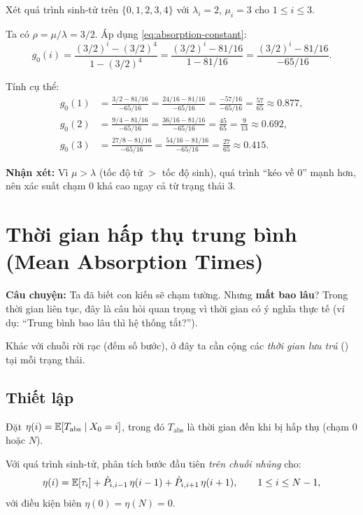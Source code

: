 \begin{example}[Xác suất hấp thụ với $N = 4$]
\label{ex:absorption-N4}
Xét quá trình sinh-tử trên $\{0, 1, 2, 3, 4\}$ với $\lambda_i = 2$, $\mu_i = 3$ cho $1 \leq i \leq 3$.

Ta có $\rho = \mu/\lambda = 3/2$. Áp dụng \eqref{eq:absorption-constant}:
\[
  g_0(i) = \frac{(3/2)^i - (3/2)^4}{1 - (3/2)^4}
  = \frac{(3/2)^i - 81/16}{1 - 81/16}
  = \frac{(3/2)^i - 81/16}{-65/16}.
\]

Tính cụ thể:
\begin{align*}
  g_0(1) &= \frac{3/2 - 81/16}{-65/16} = \frac{24/16 - 81/16}{-65/16} = \frac{-57/16}{-65/16} = \frac{57}{65} \approx 0.877, \\
  g_0(2) &= \frac{9/4 - 81/16}{-65/16} = \frac{36/16 - 81/16}{-65/16} = \frac{45}{65} = \frac{9}{13} \approx 0.692, \\
  g_0(3) &= \frac{27/8 - 81/16}{-65/16} = \frac{54/16 - 81/16}{-65/16} = \frac{27}{65} \approx 0.415.
\end{align*}

\textbf{Nhận xét:} Vì $\mu > \lambda$ (tốc độ tử $>$ tốc độ sinh), quá trình ``kéo về 0'' mạnh hơn,
nên xác suất chạm 0 khá cao ngay cả từ trạng thái 3.
\end{example}

\section{Thời gian hấp thụ trung bình (Mean Absorption Times)}
\label{sec:absorption-time}

\textbf{Câu chuyện:} Ta đã biết con kiến sẽ chạm tường. Nhưng \textbf{mất bao lâu}?
Trong thời gian liên tục, đây là câu hỏi quan trọng vì thời gian có ý nghĩa thực tế
(ví dụ: ``Trung bình bao lâu thì hệ thống tắt?'').

Khác với chuỗi rời rạc (đếm số bước), ở đây ta cần cộng các \emph{thời gian lưu trú} ()
tại mỗi trạng thái.

\subsection{Thiết lập}

Đặt $\eta(i) = \mathbb{E}[T_{\text{abs}} \mid X_0 = i]$, trong đó $T_{\text{abs}}$ là thời gian đến khi bị hấp thụ
(chạm $0$ hoặc $N$).

Với quá trình sinh-tử, phân tích bước đầu tiên \emph{trên chuỗi nhúng} cho:
\begin{equation}\label{eq:mean-abs-embedded}
  \eta(i) = \mathbb{E}[\tau_i] + \hat{P}_{i,i-1}\, \eta(i-1) + \hat{P}_{i,i+1}\, \eta(i+1),
  \qquad 1 \leq i \leq N-1,
\end{equation}
với điều kiện biên $\eta(0) = \eta(N) = 0$.

